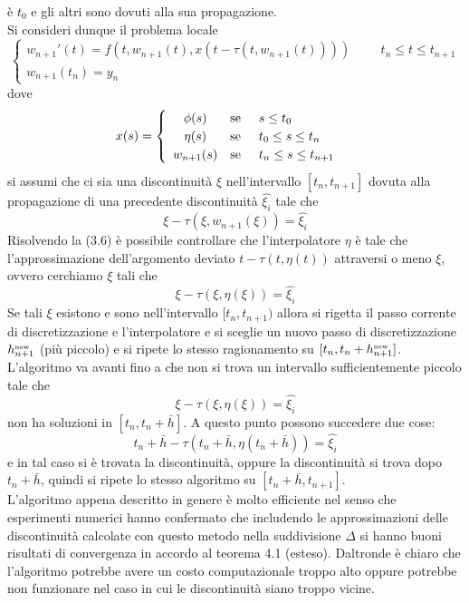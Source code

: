è $t_0$ e gli altri sono dovuti alla sua propagazione.\vspace{0.5cm}\\
Si consideri dunque il problema locale
\begin{equation}
 \begin{cases}
 w_{n+1}'(t)	=	f(t,w_{n+1}(t),x(t-\tau(t,w_{n+1}(t))))		\hspace{1cm}	t_n \le t \le t_{n+1}		\\
 w_{n+1}(t_n) 	=	 y_n
\end{cases}
\end{equation}
dove
$$
x(s)=
\begin{cases}
\begin{array}{c lc}
 \phi(s)		&	\mbox{se}	\hspace{0.5cm}		s \le t_0			\\	
 \eta(s)		&	\mbox{se}	\hspace{0.5cm}		t_0 \le s \le t_n		\\
 w_{n+1}(s)		&	\mbox{se}	\hspace{0.5cm}		t_n \le s \le t_{n+1}
\end{array}
\end{cases}
$$
si assumi che ci sia una discontinuità $\xi$ nell'intervallo $[t_n, t_{n+1}]$ dovuta alla propagazione di una precedente 
discontinuità $\widehat{\xi_{i}}$ tale che
$$
\xi-\tau(\xi,w_{n+1}(\xi))=\widehat{\xi_i}
$$
Risolvendo la (3.6) è possibile controllare che l'interpolatore $\eta$ è tale che l'approssimazione dell'argomento deviato 
$t-\tau(t,\eta(t))$ attraversi o meno $\xi$, ovvero cerchiamo $\xi$ tali che
$$
\xi-\tau(\xi,\eta(\xi))=\widehat{\xi_i}
$$
Se tali $\xi$ esistono e sono nell'intervallo $ [t_n, t_{n+1} )$ allora si rigetta il passo corrente di discretizzazione e 
l'interpolatore e si sceglie un nuovo passo di discretizzazione $h_{n+1}^{\mbox{\tiny new}}$ (più piccolo)
 e si ripete lo stesso ragionamento su  $[t_n, t_n+h_{n+1}^{\mbox{\tiny new}}]$.
L'algoritmo va avanti fino a che non si trova un intervallo sufficientemente piccolo tale che
$$
\xi-\tau(\xi,\eta(\xi))=\widehat{\xi_i}
$$
non ha soluzioni in $[t_n, t_n+\bar{h}]$. A questo punto possono succedere due cose: 
$$
t_n + \bar{h} -\tau(t_n + \bar{h},\eta(t_n + \bar{h}))=\widehat{\xi_i}
$$
e in tal caso si è trovata la discontinuità, oppure la discontinuità si trova dopo $t_n + \bar{h}$, quindi si ripete lo stesso 
algoritmo su $[t_n + \bar{h},t_{n+1}]$.
\vspace{1cm}\\
L'algoritmo appena descritto in genere è molto efficiente nel senso che esperimenti numerici hanno confermato che includendo le 
approssimazioni delle discontinuità calcolate con questo metodo nella suddivisione $\Delta$ si hanno buoni risultati di convergenza in 
accordo al teorema 4.1 (esteso). Daltronde è chiaro che l'algoritmo potrebbe avere un costo computazionale troppo alto oppure 
potrebbe non funzionare nel caso in cui le discontinuità siano troppo vicine.